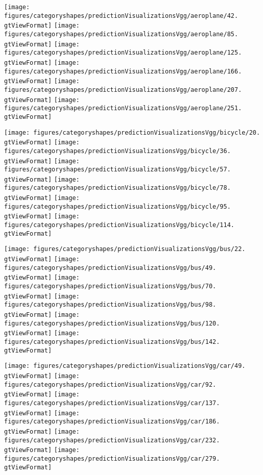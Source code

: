 \newcommand{\gtViewWidth}{0.15}
\newcommand{\gtViewFormat}{pdf}
\begin{figure*}[htb!]
\texttt{[image: figures/categoryshapes/predictionVisualizationsVgg/aeroplane/42.\\gtViewFormat]} \hfill
\texttt{[image: figures/categoryshapes/predictionVisualizationsVgg/aeroplane/85.\\gtViewFormat]}
\texttt{[image: figures/categoryshapes/predictionVisualizationsVgg/aeroplane/125.\\gtViewFormat]} \hfill
\texttt{[image: figures/categoryshapes/predictionVisualizationsVgg/aeroplane/166.\\gtViewFormat]} \hfill
\texttt{[image: figures/categoryshapes/predictionVisualizationsVgg/aeroplane/207.\\gtViewFormat]}
\texttt{[image: figures/categoryshapes/predictionVisualizationsVgg/aeroplane/251.\\gtViewFormat]}

\texttt{[image: figures/categoryshapes/predictionVisualizationsVgg/bicycle/20.\\gtViewFormat]} \hfill
\texttt{[image: figures/categoryshapes/predictionVisualizationsVgg/bicycle/36.\\gtViewFormat]} \hfill
\texttt{[image: figures/categoryshapes/predictionVisualizationsVgg/bicycle/57.\\gtViewFormat]}
\texttt{[image: figures/categoryshapes/predictionVisualizationsVgg/bicycle/78.\\gtViewFormat]} \hfill
\texttt{[image: figures/categoryshapes/predictionVisualizationsVgg/bicycle/95.\\gtViewFormat]} \hfill
\texttt{[image: figures/categoryshapes/predictionVisualizationsVgg/bicycle/114.\\gtViewFormat]}

\texttt{[image: figures/categoryshapes/predictionVisualizationsVgg/bus/22.\\gtViewFormat]} \hfill
\texttt{[image: figures/categoryshapes/predictionVisualizationsVgg/bus/49.\\gtViewFormat]} \hfill
\texttt{[image: figures/categoryshapes/predictionVisualizationsVgg/bus/70.\\gtViewFormat]}
\texttt{[image: figures/categoryshapes/predictionVisualizationsVgg/bus/98.\\gtViewFormat]} \hfill
\texttt{[image: figures/categoryshapes/predictionVisualizationsVgg/bus/120.\\gtViewFormat]} \hfill
\texttt{[image: figures/categoryshapes/predictionVisualizationsVgg/bus/142.\\gtViewFormat]}

\texttt{[image: figures/categoryshapes/predictionVisualizationsVgg/car/49.\\gtViewFormat]} \hfill
\texttt{[image: figures/categoryshapes/predictionVisualizationsVgg/car/92.\\gtViewFormat]} \hfill
\texttt{[image: figures/categoryshapes/predictionVisualizationsVgg/car/137.\\gtViewFormat]}
\texttt{[image: figures/categoryshapes/predictionVisualizationsVgg/car/186.\\gtViewFormat]} \hfill
\texttt{[image: figures/categoryshapes/predictionVisualizationsVgg/car/232.\\gtViewFormat]} \hfill
\texttt{[image: figures/categoryshapes/predictionVisualizationsVgg/car/279.\\gtViewFormat]}


\end{figure*}
